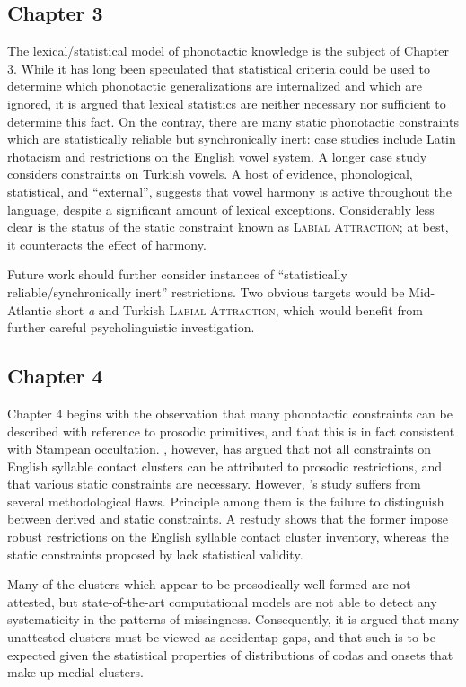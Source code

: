 \subsection{Chapter 3}

The lexical/statistical model of phonotactic knowledge is the subject of Chapter 3. 
While it has long been speculated that statistical criteria could be used to determine which phonotactic generalizations are internalized and which are ignored, it is argued that lexical statistics are neither necessary nor sufficient to determine this fact.
On the contray, there are many static phonotactic constraints which are statistically reliable but synchronically inert: case studies include Latin rhotacism and restrictions on the English vowel system.
A longer case study considers constraints on Turkish vowels.
A host of evidence, phonological, statistical, and ``external'', suggests that vowel harmony is active throughout the language, despite a significant amount of lexical exceptions.
Considerably less clear is the status of the static constraint known as \textsc{Labial Attraction}; at best, it counteracts the effect of harmony.

Future work should further consider instances of ``statistically reliable/synchronically inert'' restrictions.
Two obvious targets would be Mid-Atlantic short \emph{a} and Turkish \textsc{Labial Attraction}, which would benefit from further careful psycholinguistic investigation.

\subsection{Chapter 4}

Chapter 4 begins with the observation that many phonotactic constraints can be described with reference to prosodic primitives, and that this is in fact consistent with Stampean occultation.
\citeauthor{Pierrehumbert1994}, however, has argued that not all constraints on English syllable contact clusters can be attributed to prosodic restrictions, and that various static constraints are necessary.
However, \citeauthor{Pierrehumbert1994}'s study suffers from several methodological flaws.
Principle among them is the failure to distinguish between derived and static constraints.
A restudy shows that the former impose robust restrictions on the English syllable contact cluster inventory, whereas the static constraints proposed by \citeauthor{Pierrehumbert1994} lack statistical validity.

Many of the clusters which appear to be prosodically well-formed are not attested, but state-of-the-art computational models are not able to detect any systematicity in the patterns of missingness. 
Consequently, it is argued that many unattested clusters must be viewed as accidentap gaps, and that such is to be expected given the statistical properties of distributions of codas and onsets that make up medial clusters.

